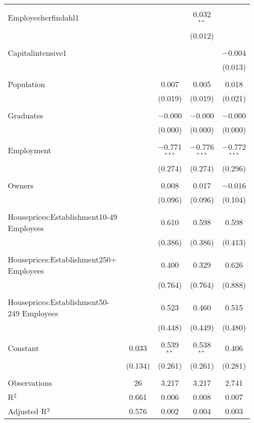 \begin{table}[!htbp]
\begin{tabular}{@{\extracolsep{5pt}}lcccc}
  & & & & \\ 
 Employeeherfindahl1 &  &  & 0.032$^{**}$ &  \\ 
  &  &  & (0.012) &  \\ 
  & & & & \\ 
 Capitalintensive1 &  &  &  & $-$0.004 \\ 
  &  &  &  & (0.013) \\ 
  & & & & \\ 
 Population &  & 0.007 & 0.005 & 0.018 \\ 
  &  & (0.019) & (0.019) & (0.021) \\ 
  & & & & \\ 
 Graduates &  & $-$0.000 & $-$0.000 & $-$0.000 \\ 
  &  & (0.000) & (0.000) & (0.000) \\ 
  & & & & \\ 
 Employment &  & $-$0.771$^{***}$ & $-$0.776$^{***}$ & $-$0.772$^{***}$ \\ 
  &  & (0.274) & (0.274) & (0.296) \\ 
  & & & & \\ 
 Owners &  & 0.008 & 0.017 & $-$0.016 \\ 
  &  & (0.096) & (0.096) & (0.104) \\ 
  & & & & \\ 
 Houseprices:Establishment10-49 Employees &  & 0.610 & 0.598 & 0.598 \\ 
  &  & (0.386) & (0.386) & (0.413) \\ 
  & & & & \\ 
 Houseprices:Establishment250+ Employees &  & 0.400 & 0.329 & 0.626 \\ 
  &  & (0.764) & (0.764) & (0.888) \\ 
  & & & & \\ 
 Houseprices:Establishment50-249 Employees &  & 0.523 & 0.460 & 0.515 \\ 
  &  & (0.448) & (0.449) & (0.480) \\ 
  & & & & \\ 
 Constant & 0.033 & 0.539$^{**}$ & 0.538$^{**}$ & 0.406 \\ 
  & (0.134) & (0.261) & (0.261) & (0.281) \\ 
  & & & & \\ 
Observations & 26 & 3,217 & 3,217 & 2,741 \\ 
R$^{2}$ & 0.661 & 0.006 & 0.008 & 0.007 \\ 
Adjusted R$^{2}$ & 0.576 & 0.002 & 0.004 & 0.003 \\ 

\end{tabular}
\end{table}
